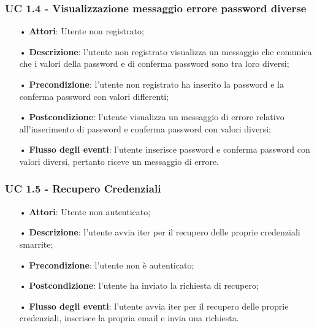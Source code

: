 \subsubsection{UC 1.4 - Visualizzazione messaggio errore password diverse}
\begin{itemize}
	\item[•]\textbf{Attori}: Utente non registrato;
	\item[•]\textbf{Descrizione}: l'utente non registrato visualizza un messaggio che comunica che i valori della password e di conferma password sono tra loro diversi;
	\item[•]\textbf{Precondizione}: l'utente non registrato ha inserito la password e la conferma password con valori differenti;
	\item[•]\textbf{Postcondizione}: l'utente visualizza un messaggio di errore relativo all'inserimento di password e conferma password con valori diversi;
	\item[•]\textbf{Flusso degli eventi}: l'utente inserisce password e conferma password con valori diversi, pertanto riceve un messaggio di errore.
\end{itemize}

\subsubsection{UC 1.5 - Recupero Credenziali}
\begin{itemize}
	\item[•]\textbf{Attori}: Utente non autenticato;
	\item[•]\textbf{Descrizione}: l’utente avvia iter per il recupero delle proprie credenziali smarrite;
	\item[•]\textbf{Precondizione}: l’utente non è autenticato;
	\item[•]\textbf{Postcondizione}: l’utente ha inviato la richiesta di recupero;
	\item[•]\textbf{Flusso degli eventi}:
	l’utente avvia iter per il recupero delle proprie credenziali, inserisce la propria email e invia una richiesta.
\end{itemize}